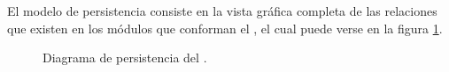 
El modelo de persistencia consiste en la vista gráfica completa de las relaciones que existen en los módulos que conforman el \saear, el cual puede verse en la figura \ref{fig:persistencia}.

 \begin{figure}[h!]
     \begin{center}
     \caption{Diagrama de persistencia del \saear.}
     \label{fig:persistencia}
     \end{center}
 \end{figure}
	


